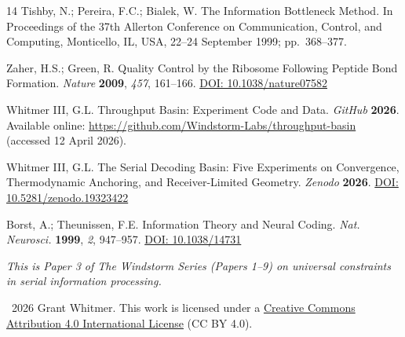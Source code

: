 \documentclass[11pt]{article}
\begin{document}
\begin{thebibliography}{14}
Tishby, N.; Pereira, F.C.; Bialek, W.
The Information Bottleneck Method.
In Proceedings of the 37th Allerton Conference on Communication, Control, and Computing, Monticello, IL, USA, 22--24 September 1999; pp.\ 368--377.

Zaher, H.S.; Green, R.
Quality Control by the Ribosome Following Peptide Bond Formation.
\textit{Nature} \textbf{2009}, \textit{457}, 161--166.
\href{https://doi.org/10.1038/nature07582}{DOI: 10.1038/nature07582}

Whitmer III, G.L.
Throughput Basin: Experiment Code and Data.
\textit{GitHub} \textbf{2026}.
Available online: \url{https://github.com/Windstorm-Labs/throughput-basin} (accessed 12 April 2026).

Whitmer III, G.L.
The Serial Decoding Basin: Five Experiments on Convergence, Thermodynamic Anchoring, and Receiver-Limited Geometry.
\textit{Zenodo} \textbf{2026}.
\href{https://doi.org/10.5281/zenodo.19323422}{DOI: 10.5281/zenodo.19323422}

Borst, A.; Theunissen, F.E.
Information Theory and Neural Coding.
\textit{Nat. Neurosci.} \textbf{1999}, \textit{2}, 947--957.
\href{https://doi.org/10.1038/14731}{DOI: 10.1038/14731}

\end{thebibliography}

\vspace{2em}
\noindent\textit{This is Paper 3 of The Windstorm Series (Papers 1--9) on universal constraints in serial information processing.}

\vspace{1em}
\noindent\textcopyright~2026 Grant Whitmer. This work is licensed under a \href{https://creativecommons.org/licenses/by/4.0/}{Creative Commons Attribution 4.0 International License} (CC BY 4.0).
\end{document}
